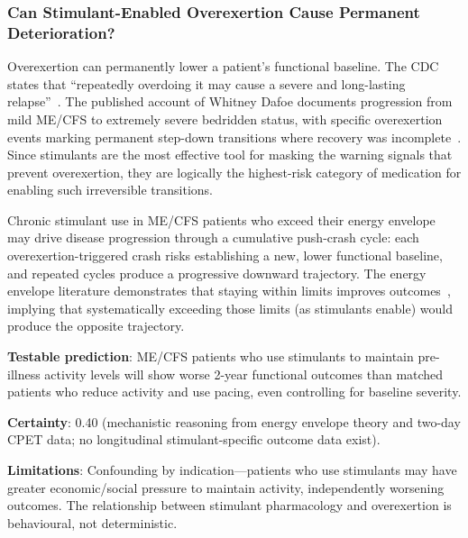 \subsubsection{Can Stimulant-Enabled Overexertion Cause Permanent Deterioration?}

Overexertion can permanently lower a patient's functional baseline. The CDC states that ``repeatedly overdoing it may cause a severe and long-lasting relapse''~\cite{CDC2024preventing}. The published account of Whitney Dafoe documents progression from mild ME/CFS to extremely severe bedridden status, with specific overexertion events marking permanent step-down transitions where recovery was incomplete~\cite{Dafoe2021severe}. Since stimulants are the most effective tool for masking the warning signals that prevent overexertion, they are logically the highest-risk category of medication for enabling such irreversible transitions.

\begin{speculation}
\label{spec:stimulant-progression}

Chronic stimulant use in ME/CFS patients who exceed their energy envelope may drive disease progression through a cumulative push-crash cycle: each overexertion-triggered crash risks establishing a new, lower functional baseline, and repeated cycles produce a progressive downward trajectory. The energy envelope literature demonstrates that staying within limits improves outcomes~\cite{Jason2008EnergyEnvelope,Jason2013envelope}, implying that systematically exceeding those limits (as stimulants enable) would produce the opposite trajectory.

\textbf{Testable prediction}: ME/CFS patients who use stimulants to maintain pre-illness activity levels will show worse 2-year functional outcomes than matched patients who reduce activity and use pacing, even controlling for baseline severity.

\textbf{Certainty}: 0.40 (mechanistic reasoning from energy envelope theory and two-day CPET data; no longitudinal stimulant-specific outcome data exist).

\textbf{Limitations}: Confounding by indication---patients who use stimulants may have greater economic/social pressure to maintain activity, independently worsening outcomes. The relationship between stimulant pharmacology and overexertion is behavioural, not deterministic.
\end{speculation}

